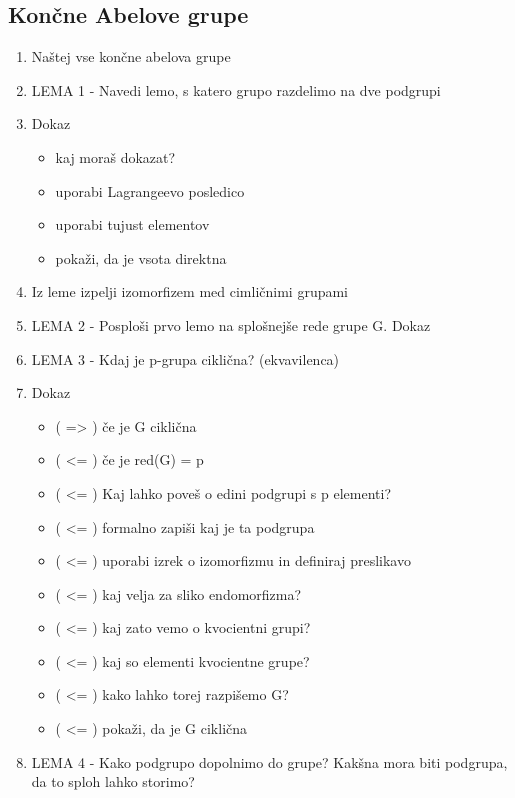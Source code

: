 \documentclass{article}
\begin{document}
    \subsection{Končne Abelove grupe}
    \begin{enumerate}
        \item Naštej vse končne abelova grupe
        \item LEMA 1 - Navedi lemo, s katero grupo razdelimo na dve podgrupi
        \item Dokaz
        \begin{itemize}
            \item kaj moraš dokazat?
            \item uporabi Lagrangeevo posledico
            \item uporabi tujust elementov
            \item pokaži, da je vsota direktna
        \end{itemize}
        \item Iz leme izpelji izomorfizem med cimličnimi grupami
        \item LEMA 2 - Posploši prvo lemo na splošnejše rede grupe G. Dokaz
        \item LEMA 3 - Kdaj je p-grupa ciklična? (ekvavilenca)
        \item Dokaz
        \begin{itemize}
            \item ( => ) če je G ciklična
            \item ( <= ) če je red(G) = p
            \item ( <= ) Kaj lahko poveš o edini podgrupi s p elementi?
            \item ( <= ) formalno zapiši kaj je ta podgrupa
            \item ( <= ) uporabi izrek o izomorfizmu in definiraj preslikavo
            \item ( <= ) kaj velja za sliko endomorfizma?
            \item ( <= ) kaj zato vemo o kvocientni grupi?
            \item ( <= ) kaj so elementi kvocientne grupe?
            \item ( <= ) kako lahko torej razpišemo G?
            \item ( <= ) pokaži, da je G ciklična
        \end{itemize}
        \item LEMA 4 - Kako podgrupo dopolnimo do grupe? Kakšna mora biti podgrupa, da to sploh lahko storimo?

\end{enumerate}
\end{document}
